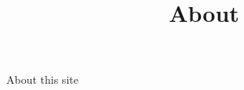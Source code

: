 \documentclass[
  ignorenonframetext,
  aspectratio=169,
]{beamer}
\title{About}
\author{}
\date{}
\begin{document}
\frame{\titlepage}


\begin{frame}
About this site
\end{frame}
\end{document}
